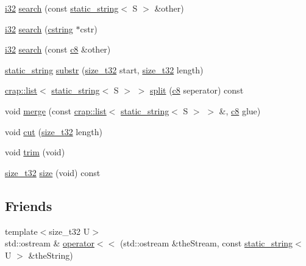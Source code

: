 \begin{DoxyCompactItemize}
\item 
\hyperlink{types_8h_a48d6cd8e4135fb2ff7e7f2dac84089ec}{i32} \hyperlink{classcrap_1_1static__string_a6d970c5313b9be5e539f2bdb70e671dd}{search} (const \hyperlink{classcrap_1_1static__string}{static\-\_\-string}$<$ S $>$ \&other)
\item 
\hyperlink{types_8h_a48d6cd8e4135fb2ff7e7f2dac84089ec}{i32} \hyperlink{classcrap_1_1static__string_ad6a69556db50a17e7accfd027efc75f0}{search} (\hyperlink{types_8h_a5849681cb91aa8afef6996d9d9e90881}{cstring} $\ast$cstr)
\item 
\hyperlink{types_8h_a48d6cd8e4135fb2ff7e7f2dac84089ec}{i32} \hyperlink{classcrap_1_1static__string_a0cbab850fc2764f042598d181d4a63a2}{search} (const \hyperlink{types_8h_aa1ba8aac9fcd831012308297336ac74b}{c8} \&other)
\item 
\hyperlink{classcrap_1_1static__string}{static\-\_\-string} \hyperlink{classcrap_1_1static__string_a71197a049443036af53588a4fc5697a9}{substr} (\hyperlink{types_8h_a38c0a12279ffe0fabec44939e753c914}{size\-\_\-t32} start, \hyperlink{types_8h_a38c0a12279ffe0fabec44939e753c914}{size\-\_\-t32} length)
\item 
\hyperlink{classcrap_1_1list}{crap\-::list}$<$ \hyperlink{classcrap_1_1static__string}{static\-\_\-string}$<$ S $>$ $>$ \hyperlink{classcrap_1_1static__string_a7e00a0faa8e4976f832cc5bb502ed74e}{split} (\hyperlink{types_8h_aa1ba8aac9fcd831012308297336ac74b}{c8} seperator) const 
\item 
void \hyperlink{classcrap_1_1static__string_ae1d7c976623c15ae485b5fdf4ee94ce4}{merge} (const \hyperlink{classcrap_1_1list}{crap\-::list}$<$ \hyperlink{classcrap_1_1static__string}{static\-\_\-string}$<$ S $>$ $>$ \&, \hyperlink{types_8h_aa1ba8aac9fcd831012308297336ac74b}{c8} glue)
\item 
void \hyperlink{classcrap_1_1static__string_a14eca52120e4619becdfd694f3cf1837}{cut} (\hyperlink{types_8h_a38c0a12279ffe0fabec44939e753c914}{size\-\_\-t32} length)
\item 
void \hyperlink{classcrap_1_1static__string_aad3f00f251f5c3524abb2ecb1a17d21b}{trim} (void)
\item 
\hyperlink{types_8h_a38c0a12279ffe0fabec44939e753c914}{size\-\_\-t32} \hyperlink{classcrap_1_1static__string_a51656ae03018ae35838bd08caa81bc2a}{size} (void) const 
\end{DoxyCompactItemize}
\subsection*{Friends}
\begin{DoxyCompactItemize}
\item 
{\footnotesize template$<$size\-\_\-t32 U$>$ }\\std\-::ostream \& \hyperlink{classcrap_1_1static__string_a4911973dfffabb148d8bbfd2e8cd06c3}{operator$<$$<$} (std\-::ostream \&the\-Stream, const \hyperlink{classcrap_1_1static__string}{static\-\_\-string}$<$ U $>$ \&the\-String)
\end{DoxyCompactItemize}


